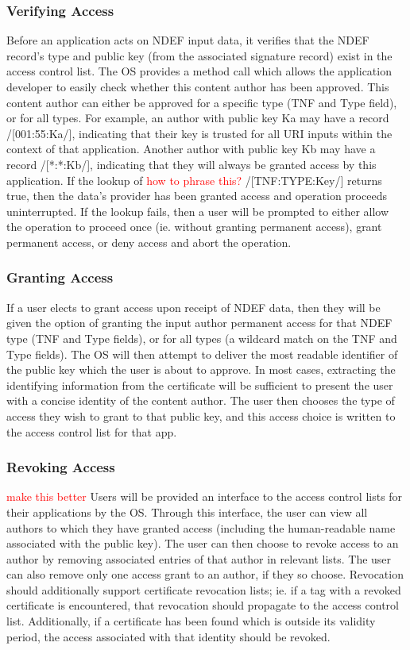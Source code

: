 \documentclass[12pt]{article}
\newcommand\todo[1]{\textcolor{red}{#1}}
\begin{document}
\subsubsection{Verifying Access}
Before an application acts on NDEF input data, it verifies that the NDEF record's type and public key (from the associated signature record) exist in the access control list.
The OS provides a method call which allows the application developer to easily check whether this content author has been approved.
This content author can either be approved for a specific type (TNF and Type field), or for all types.
For example, an author with public key Ka may have a record /[001:55:Ka/], indicating that their key is trusted for all URI inputs within the context of that application.
Another author with public key Kb may have a record /[*:*:Kb/], indicating that they will always be granted access by this application.
If the lookup of \todo{how to phrase this?} /[TNF:TYPE:Key/] returns true, then the data's provider has been granted access and operation proceeds uninterrupted.
If the lookup fails, then a user will be prompted to either allow the operation to proceed once (ie. without granting permanent access), grant permanent access, or deny access and abort the operation.
\subsubsection{Granting Access}
If a user elects to grant access upon receipt of NDEF data, then they will be given the option of granting the input author permanent access for that NDEF type (TNF and Type fields), or for all types (a wildcard match on the TNF and Type fields).
The OS will then attempt to deliver the most readable identifier of the public key which the user is about to approve.
In most cases, extracting the identifying information from the certificate will be sufficient to present the user with a concise identity of the content author.
The user then chooses the type of access they wish to grant to that public key, and this access choice is written to the access control list for that app.
\subsubsection{Revoking Access}
\todo{make this better}
Users will be provided an interface to the access control lists for their applications by the OS.
Through this interface, the user can view all authors to which they have granted access (including the human-readable name associated with the public key).
The user can then choose to revoke access to an author by removing associated entries of that author in relevant lists.
The user can also remove only one access grant to an author, if they so choose.
Revocation should additionally support certificate revocation lists; ie. if a tag with a revoked certificate is encountered, that revocation should propagate to the access control list.
Additionally, if a certificate has been found which is outside its validity period, the access associated with that identity should be revoked.
\end{document}
